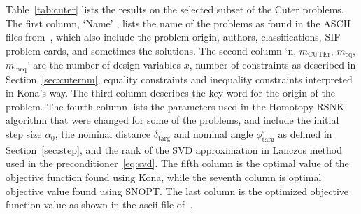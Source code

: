 Table~\ref{tab:cuter} lists the results on the selected subset of the Cuter problems. The first column, `Name' , lists the name of the problems 
as found in the ASCII files from~\cite{cuter_probs}, which also include the
problem origin, authors, classifications, SIF problem cards, and sometimes the solutions. The second column `n,  $m_{\text{CUTEr}}$, $m_{\text{eq}}$,  $m_{\text{ineq}}$' are the number of design variables $x$, number of constraints as described in Section~\ref{sec:cuternm}, equality constraints and inequality constraints interpreted in Kona's way. The third column describes the key word for the origin  of the problem. The fourth column lists the parameters used in the Homotopy RSNK algorithm that were changed for some of the problems, and include the initial step size $\textbf{$\alpha_0$}$, the nominal distance  $\delta_{\text{targ}}$  and nominal angle $\phi^{\circ}_{\text{targ}}$ as defined in Section~\ref{sec:step}, and the rank of the SVD approximation in Lanczos method used in the preconditioner~\ref{eq:svd}. The fifth column is the optimal value of the  objective function found using Kona, while the seventh column is optimal objective value found using SNOPT. The last column is the optimized objective function value as shown in the ascii file of~\cite{cuter_probs}. 

